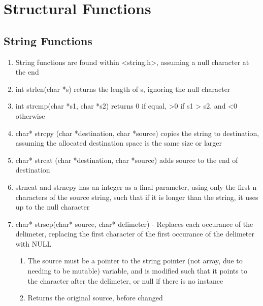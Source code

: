 \documentclass[11 pt, twoside]{article}
\begin{document}
\section{Structural Functions}
\subsection{String Functions}
\begin{enumerate}
\item String functions are found within <string.h>, assuming a null character at the end
\item int strlen(char *s) returns the length of s, ignoring the null character
\item int strcmp(char *s1, char *s2) returns 0 if equal, >0 if s1 > s2, and <0 otherwise
\item char* strcpy (char *destination, char *source) copies the string to destination, assuming the allocated destination space is the same size or larger
\item char* strcat (char *destination, char *source) adds source to the end of destination
\item strncat and strncpy has an integer as a final parameter, using only the first n characters of the source string, such that if it is longer than the string, it uses up to the null character 
\item char* strsep(char* source, char* delimeter) - Replaces each occurance of the delimeter, replacing the first character of the first occurance of the delimeter with NULL
\begin{enumerate}
\item The source must be a pointer to the string pointer (not array, due to needing to be mutable) variable, and is modified such that it points to the character after the delimeter, or null if there is no instance
\item Returns the original source, before changed
\end{enumerate}
\end{enumerate}
\end{document}
